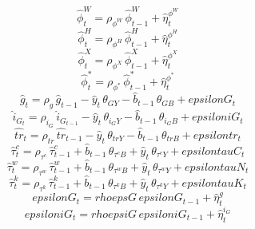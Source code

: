 \begin{dmath}
{\hat{\phi}^W_{t}}={\rho_{\phi^W}}\, {\hat{\phi}^W_{t-1}}+{\hat{\eta}^{\phi^W}_{t}}
\end{dmath}
\begin{dmath}
{\hat{\phi}^H_{t}}={\rho_{\phi^H}}\, {\hat{\phi}^H_{t-1}}+{\hat{\eta}^{\phi^H}_{t}}
\end{dmath}
\begin{dmath}
{\hat{\phi}^X_{t}}={\rho_{\phi^X}}\, {\hat{\phi}^X_{t-1}}+{\hat{\eta}^{\phi^X}_{t}}
\end{dmath}
\begin{dmath}
{\hat{\phi}^*_{t}}={\rho_{\phi^*}}\, {\hat{\phi}^*_{t-1}}+{\hat{\eta}^{\phi^*}_{t}}
\end{dmath}
\begin{dmath}
{\hat{g}_{t}}={\rho_{g}}\, {\hat{g}_{t-1}}-{\hat{y}_{t}}\, {\theta_{GY}}-{\hat{b}_{t-1}}\, {\theta_{GB}}+{epsilonG_{t}}
\end{dmath}
\begin{dmath}
{\hat{i}_G_{t}}={\rho_{i_G}}\, {\hat{i}_G_{t-1}}-{\hat{y}_{t}}\, {\theta_{i_GY}}-{\hat{b}_{t-1}}\, {\theta_{i_GB}}+{epsiloniG_{t}}
\end{dmath}
\begin{dmath}
{\hat{tr}_{t}}={\rho_{tr}}\, {\hat{tr}_{t-1}}-{\hat{y}_{t}}\, {\theta_{trY}}-{\hat{b}_{t-1}}\, {\theta_{trB}}+{epsilontr_{t}}
\end{dmath}
\begin{dmath}
{\hat{\tau}^c_{t}}={\rho_{\tau^c}}\, {\hat{\tau}^c_{t-1}}+{\hat{b}_{t-1}}\, {\theta_{\tau^cB}}+{\hat{y}_{t}}\, {\theta_{\tau^cY}}+{epsilontauC_{t}}
\end{dmath}
\begin{dmath}
{\hat{\tau}^w_{t}}={\rho_{\tau^w}}\, {\hat{\tau}^w_{t-1}}+{\hat{b}_{t-1}}\, {\theta_{\tau^wB}}+{\hat{y}_{t}}\, {\theta_{\tau^wY}}+{epsilontauN_{t}}
\end{dmath}
\begin{dmath}
{\hat{\tau}^k_{t}}={\rho_{\tau^k}}\, {\hat{\tau}^k_{t-1}}+{\hat{b}_{t-1}}\, {\theta_{\tau^kB}}+{\hat{y}_{t}}\, {\theta_{\tau^kY}}+{epsilontauK_{t}}
\end{dmath}
\begin{dmath}
{epsilonG_{t}}={rhoepsG}\, {epsilonG_{t-1}}+{\hat{\eta}^{g}_{t}}
\end{dmath}
\begin{dmath}
{epsiloniG_{t}}={rhoepsiG}\, {epsiloniG_{t-1}}+{\hat{\eta}^{i_G}_{t}}
\end{dmath}

